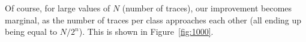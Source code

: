 \documentclass[conference,twocolumn]{IEEEtran}
\begin{document}
Of course, for large values of $N$ (number of traces), our improvement becomes marginal, as the number of traces per class approaches each other (all ending up being equal to $N/2^n$). 
This is shown in Figure~\ref{fig:1000}.
  \begin{figure}%
    \centering
    

\end{figure}
\end{document}
